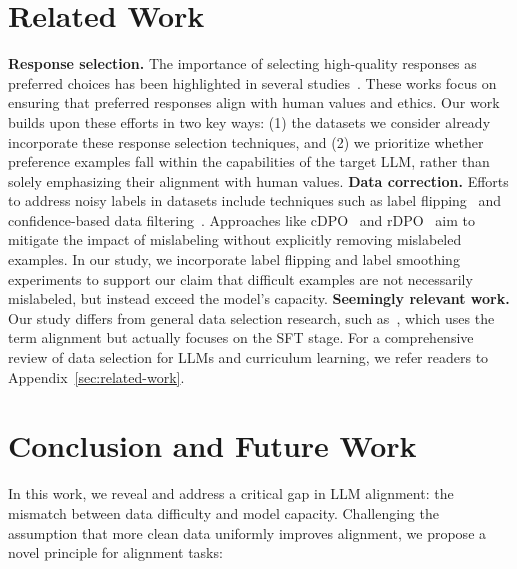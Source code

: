 \section{Related Work}

\textbf{Response selection.} The importance of selecting high-quality responses as preferred choices has been highlighted in several studies~\cite{bai2022training, ethayarajh2022understanding, tunstall2023zephyr}. These works focus on ensuring that preferred responses align with human values and ethics. Our work builds upon these efforts in two key ways: (1) the datasets we consider already incorporate these response selection techniques, and (2) we prioritize whether preference examples fall within the capabilities of the target LLM, rather than solely emphasizing their alignment with human values. 
\textbf{Data correction.} Efforts to address noisy labels in datasets include techniques such as label flipping~\cite{wang2024secrets} and confidence-based data filtering~\cite{gao2024impact}. Approaches like cDPO~\cite{mitchell2023note} and rDPO~\cite{chowdhury2024provably} aim to mitigate the impact of mislabeling without explicitly removing mislabeled examples. In our study, we incorporate label flipping and label smoothing experiments to support our claim that difficult examples are not necessarily mislabeled, but instead exceed the model's capacity.
\textbf{Seemingly relevant work.} 
Our study differs from general data selection research, such as~\citet{liu2024what, xia2024rethinking}, which uses the term alignment but actually focuses on the SFT stage. For a comprehensive review of data selection for LLMs and curriculum learning, we refer readers to Appendix~\ref{sec:related-work}.





\section{Conclusion and Future Work}
In this work, we reveal and address a critical gap in LLM alignment: the mismatch between data difficulty and model capacity. Challenging the assumption that more clean data uniformly improves alignment, we propose a novel principle for alignment tasks:


